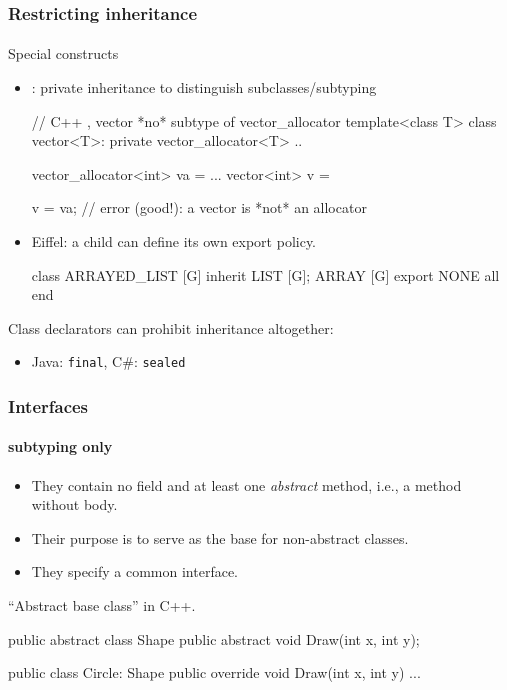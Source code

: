 \documentclass{beamer}
\begin{document}
\begin{frame}[fragile]
\frametitle{Restricting inheritance}
\framesubtitle{}
Special constructs 
\begin{itemize}
\item \Cpp: private inheritance to distinguish subclasses/subtyping
\begin{cplus3}
// C++ , vector *no* subtype of vector_allocator
template<class T>
class vector<T>: private vector_allocator<T>  {..}

vector_allocator<int> va = ...
vector<int> v = 

v = va;  // error (good!): a vector is *not* an allocator
\end{cplus3}
\item Eiffel: a child can define its own export policy.
\begin{eiffel}
class ARRAYED_LIST [G] inherit 
    LIST [G]; 
    ARRAY [G]
    export {NONE} all end

\end{eiffel}
\end{itemize}

Class declarators
can prohibit inheritance altogether:
\begin{itemize}
\item Java: \texttt{final}, C\#: \texttt{sealed}
\end{itemize} 
\end{frame}

\begin{frame}[fragile]

\frametitle{Interfaces}
\framesubtitle{subtyping only}

\begin{itemize}
\item They contain no field and at least one \textit{abstract} method, i.e., 
a method without body. 
\item Their purpose is to serve as the base for non-abstract classes.
\item They specify a common interface. 
\end{itemize}

``Abstract base class'' in C++.

\begin{cplus3}
public abstract class Shape {
    public abstract void Draw(int x, int y);
}

public class Circle: Shape {
    public override void Draw(int x, int y) { ... }
}
\end{cplus3}
\end{frame}
\end{document}
